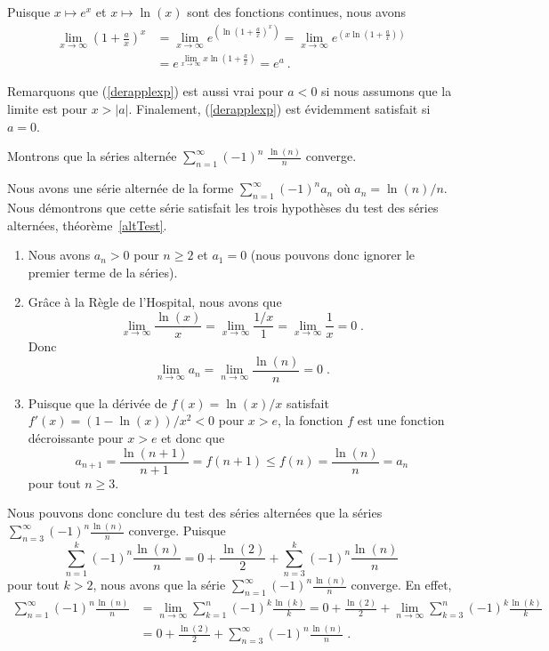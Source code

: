 {\begin{egg}[\eng]
Puisque $x \mapsto e^x$ et $x\mapsto \ln(x)$ sont des fonctions
continues, nous avons
\begin{align*}
\lim_{x\rightarrow \infty} \left(1+\frac{a}{x}\right)^x &
= \lim_{x\rightarrow \infty} e^{\left( \ln\left(1+\frac{a}{x}\right)^x\right)}
= \lim_{x\rightarrow \infty} e^{\left(x\ln\left(1+\frac{a}{x}\right)\right)} \\
&= e^{\lim_{x\rightarrow \infty} x\ln\left(1+\frac{a}{x}\right)}
= e^a \ .
\end{align*}

Remarquons que (\ref{derapplexp}) est aussi vrai pour $a<0$ si nous
assumons que la limite est pour $x>|a|$. Finalement,
(\ref{derapplexp}) est évidemment satisfait si $a=0$.
\end{egg}

\begin{egg}[\eng]
Montrons que la séries alternée
$\displaystyle \sum_{n=1}^\infty (-1)^n\;\frac{\ln(n)}{n}$ converge.

Nous avons une série alternée de la forme
$\displaystyle \sum_{n=1}^\infty (-1)^n a_n$ où $a_n = \ln(n)/n$.  Nous
démontrons que cette série satisfait les trois hypothèses du test des
séries alternées, théorème~\ref{altTest}.
\begin{enumerate}
\item Nous avons $a_n>0$ pour $n\geq 2$ et $a_1 = 0$ (nous pouvons donc ignorer
le premier terme de la séries).
\item Grâce à la Règle de l'Hospital, nous avons que
\[
\lim_{x\rightarrow \infty} \frac{\ln(x)}{x}
= \lim_{x\rightarrow \infty} \frac{1/x}{1}
= \lim_{x\rightarrow \infty} \frac{1}{x} = 0 \; .
\]
Donc
\[
\lim_{n\rightarrow \infty} a_n = \lim_{n\rightarrow \infty} \frac{\ln(n)}{n}
= 0 \; .
\]
\item Puisque que la dérivée de $f(x) = \ln(x)/x$ satisfait
$f'(x) = (1-\ln(x))/x^2 < 0$ pour $x>e$, la fonction $f$ est une fonction
décroissante pour $x>e$ et donc que
\[
a_{n+1} = \frac{\ln(n+1)}{n+1} = f(n+1) \leq f(n) = \frac{\ln(n)}{n} =
a_n
\]
pour tout $n\geq 3$.
\end{enumerate}
Nous pouvons donc conclure du test des séries alternées que la séries
$\displaystyle \sum_{n=3}^\infty (-1)^n \frac{\ln(n)}{n}$ converge.
Puisque
\[
\sum_{n=1}^k (-1)^n \frac{\ln(n)}{n}
= 0 + \frac{\ln(2)}{2} + \sum_{n=3}^k (-1)^n \frac{\ln(n)}{n}
\]
pour tout $k>2$, nous avons que la série
$\displaystyle \sum_{n=1}^\infty (-1)^n \frac{\ln(n)}{n}$ converge.  En effet,
\begin{align*}
\sum_{n=1}^\infty (-1)^n \frac{\ln(n)}{n}
&= \lim_{n\rightarrow \infty} \sum_{k=1}^n (-1)^k \frac{\ln(k)}{k}
= 0 + \frac{\ln(2)}{2}
+ \lim_{n\rightarrow \infty} \sum_{k=3}^n (-1)^k \frac{\ln(k)}{k} \\
&= 0 + \frac{\ln(2)}{2}
+ \sum_{n=3}^\infty (-1)^n \frac{\ln(n)}{n} \; .
\end{align*}
\label{deriveAlt}
\end{egg}

}

